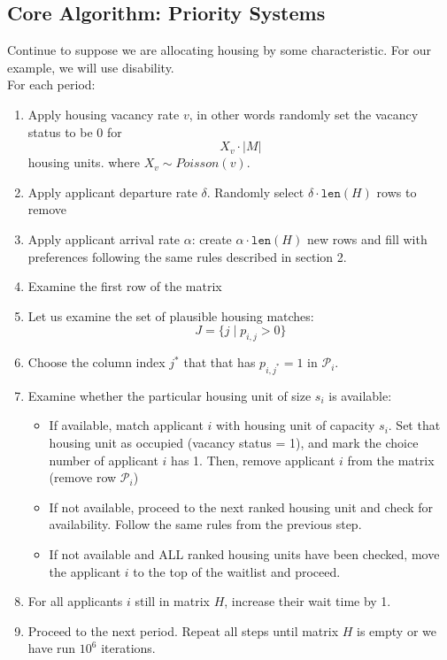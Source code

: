 \documentclass[11pt]{article}
\begin{document}
\subsection{Core Algorithm: Priority Systems}
Continue to suppose we are allocating housing by some characteristic. For our example, we will use disability.\\
\newline
For each period:
\begin{enumerate}
    \item Apply housing vacancy rate $v$, in other words randomly set the vacancy status to be $0$ for
    \[X_v \cdot |M|\]
    housing units.
    where $X_v \sim Poisson(v)$.
    \item Apply applicant departure rate $\delta$. Randomly select $\delta \cdot \texttt{len}(H)$ rows to remove
    \item Apply applicant arrival rate $\alpha$: create $\alpha \cdot \texttt{len}(H)$ new rows and fill with preferences following the same rules described in section 2.
    \item Examine the first row of the matrix
    \item Let us examine the set of plausible housing matches:
    \[J = \{j \mid p_{i,j} > 0\}\]
    \item Choose the column index $j^*$ that that has $p_{i,j^*} = 1$ in $\mathcal{P}_i$.
    \item Examine whether the particular housing unit of size $s_i$ is available:
        \begin{itemize}
        \item If available, match applicant $i$ with housing unit of capacity $s_i$. Set that housing unit as occupied (vacancy status = 1), and mark the choice number of applicant $i$ has 1. Then, remove applicant $i$ from the matrix (remove row $\mathcal{P}_i$)
        \item If not available, proceed to the next ranked housing unit and check for availability. Follow the same rules from the previous step.
        \item If not available and ALL ranked housing units have been checked, move the applicant $i$ to the top of the waitlist and proceed. 
    \end{itemize}
    \item For all applicants $i$ still in matrix $H$, increase their wait time by 1. 
    \item Proceed to the next period. Repeat all steps until matrix $H$ is empty or we have run $10^6$ iterations.
\end{enumerate}
\end{document}
